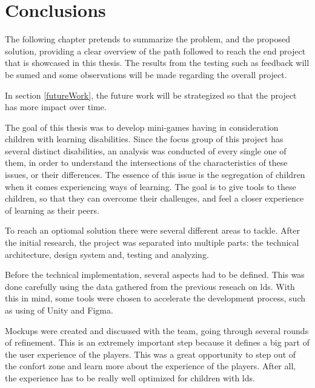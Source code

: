 \chapter{Conclusions}
\label{cha:conclusions}

The following chapter pretends to summarize the problem, and the proposed solution, providing a clear overview of the path followed to reach the end project that is showcased in this thesis.
The results from the testing such as feedback will be sumed and some observations will be made regarding the overall project.

In section \ref{futureWork}, the future work will be strategized so that the project has more impact over time.


The goal of this thesis was to develop mini-games having in consideration children with learning disabilities. Since the focus group of this project has several distinct disabilities, an analysis was conducted of every single one of them, in order to understand the intersections of the characteristics of these issues, or their differences. The essence of this issue is the segregation of children when it comes experiencing ways of learning. The goal is to give tools to these children, so that they can overcome their challenges, and feel a closer experience of learning as their peers.

To reach an optiomal solution there were several different areas to tackle. After the initial research, the project was separated into multiple parts: the technical architecture, design system and, testing and analyzing.

Before the technical implementation, several aspects had to be defined. This was done carefully using the data gathered from the previous reseach on \gls{ld}s. With this in mind, some tools were chosen to accelerate the development process, such as using of Unity and Figma.

Mockups were created and discussed with the team, going through several rounds of refinement. This is an extremely important step because it defines a big part of the user experience of the players. This was a great opportunity to step out of the confort zone and learn more about the experience of the players. After all, the experience has to be really well optimized for children with \gls{ld}s.

